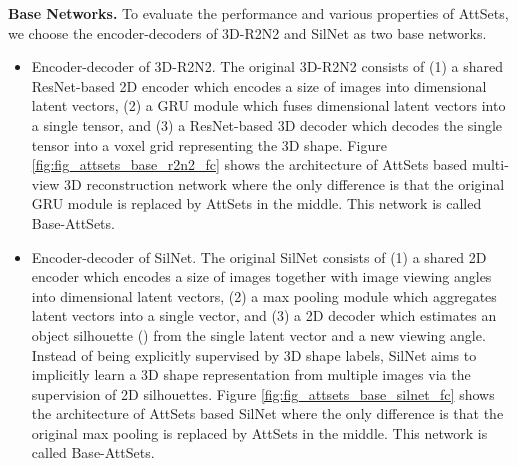 \documentclass[twocolumn]{svjour3}    \pdfoutput=1
\newcommand{\nickname}{AttSets}
\begin{document}
\textbf{Base Networks.} To evaluate the performance and various properties of \nickname{}, we choose the encoder-decoders of 3D-R2N2 \citep{Chan2016} and SilNet \citep{Wiles2017} as two base networks. 
\begin{itemize}[leftmargin=0.25cm]
\item Encoder-decoder of 3D-R2N2. The original 3D-R2N2 consists of (1) a shared ResNet-based 2D encoder which encodes a size of  images into  dimensional latent vectors, (2) a GRU module which fuses   dimensional latent vectors into a single  tensor, and (3) a ResNet-based 3D decoder which decodes the single tensor into a  voxel grid representing the 3D shape. Figure \ref{fig:fig_attsets_base_r2n2_fc} shows the architecture of \nickname{} based multi-view 3D reconstruction network where the only difference is that the original GRU module is replaced by \nickname{} in the middle. This network is called Base-AttSets.

\item Encoder-decoder of SilNet. The original SilNet consists of (1) a shared 2D encoder which encodes a size of  images together with image viewing angles into  dimensional latent vectors, (2) a max pooling module which aggregates  latent vectors into a single vector, and (3) a 2D decoder which estimates an object silhouette () from the single latent vector and a new viewing angle. Instead of being explicitly supervised by 3D shape labels, SilNet aims to implicitly learn a 3D shape representation from multiple images via the supervision of 2D silhouettes. Figure \ref{fig:fig_attsets_base_silnet_fc} shows the architecture of \nickname{} based SilNet where the only difference is that the original max pooling is replaced by \nickname{} in the middle. This network is called Base-AttSets.

\end{itemize}
\end{document}
